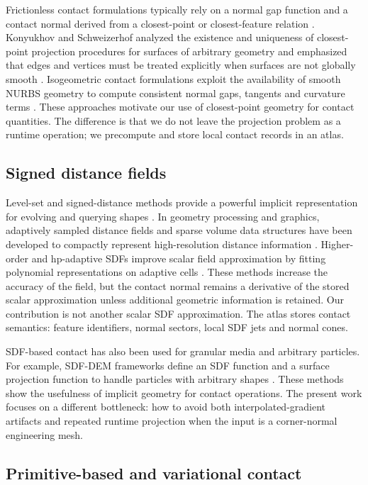 \documentclass[preprint,12pt,sort&compress]{elsarticle}
\begin{document}
Frictionless contact formulations typically rely on a normal gap function and a contact normal derived from a closest-point or closest-feature relation \cite{Wriggers2006,Laursen2002}. Konyukhov and Schweizerhof analyzed the existence and uniqueness of closest-point projection procedures for surfaces of arbitrary geometry and emphasized that edges and vertices must be treated explicitly when surfaces are not globally smooth \cite{Konyukhov2008,Konyukhov2013}. Isogeometric contact formulations exploit the availability of smooth NURBS geometry to compute consistent normal gaps, tangents and curvature terms \cite{Lu2011,Temizer2011}. These approaches motivate our use of closest-point geometry for contact quantities. The difference is that we do not leave the projection problem as a runtime operation; we precompute and store local contact records in an atlas.

\subsection{Signed distance fields}

Level-set and signed-distance methods provide a powerful implicit representation for evolving and querying shapes \cite{Sethian1999,OsherFedkiw2003}. In geometry processing and graphics, adaptively sampled distance fields and sparse volume data structures have been developed to compactly represent high-resolution distance information \cite{Frisken2000,Museth2013}. Higher-order and hp-adaptive SDFs improve scalar field approximation by fitting polynomial representations on adaptive cells \cite{Koschier2017,Pujol2023}. These methods increase the accuracy of the field, but the contact normal remains a derivative of the stored scalar approximation unless additional geometric information is retained. Our contribution is not another scalar SDF approximation. The atlas stores contact semantics: feature identifiers, normal sectors, local SDF jets and normal cones.

SDF-based contact has also been used for granular media and arbitrary particles. For example, SDF-DEM frameworks define an SDF function and a surface projection function to handle particles with arbitrary shapes \cite{Lai2022}. These methods show the usefulness of implicit geometry for contact operations. The present work focuses on a different bottleneck: how to avoid both interpolated-gradient artifacts and repeated runtime projection when the input is a corner-normal engineering mesh.

\subsection{Primitive-based and variational contact}
\end{document}
